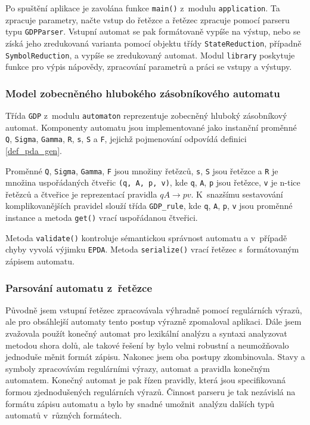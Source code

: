 Po spuštění aplikace je zavolána funkce \texttt{main()} z~modulu \texttt{application}. Ta zpracuje parametry, načte vstup do řetězce a řetězec zpracuje pomocí parseru typu \texttt{GDPParser}. Vstupní automat se pak formátovaně vypíše na výstup, nebo se získá jeho zredukovaná varianta pomocí objektu třídy \texttt{StateReduction}, případně \texttt{SymbolReduction}, a vypíše se zredukovaný automat. Modul \texttt{library} poskytuje funkce pro výpis nápovědy, zpracování parametrů a práci se vstupy a výstupy.


\subsubsection{Model zobecněného hlubokého zásobníkového automatu}

Třída \texttt{GDP} z~modulu \texttt{automaton} reprezentuje zobecněný hluboký zásobníkový automat. Komponenty automatu jsou implementované jako instanční proměnné \texttt{Q}, \texttt{Sigma}, \texttt{Gamma}, \texttt{R}, \texttt{s}, \texttt{S} a \texttt{F}, jejichž pojmenování odpovídá definici \ref{def_pda_gen}. 

Proměnné \texttt{Q}, \texttt{Sigma}, \texttt{Gamma}, \texttt{F} jsou množiny řetězců, \texttt{s}, \texttt{S} jsou řetězce a \texttt{R} je množina uspořádaných čtveřic \texttt{(q, A, p, v)}, kde \texttt{q}, \texttt{A}, \texttt{p} jsou řetězce, \texttt{v} je n-tice řetězců a čtveřice je reprezentací pravidla $qA \rightarrow pv$. 
K~snazšímu sestavování komplikovanějších pravidel slouží třída \texttt{GDP\_rule}, kde \texttt{q}, \texttt{A}, \texttt{p}, \texttt{v} jsou proměnné instance a metoda \texttt{get()} vrací uspořádanou čtveřici.

Metoda \texttt{validate()} kontroluje sémantickou správnost automatu a v~případě chyby vyvolá výjimku \texttt{EPDA}. Metoda \texttt{serialize()} vrací řetězec s~formátovaným zápisem automatu.

\subsubsection{Parsování automatu z~řetězce}

Původně jsem vstupní řetězec zpracovávala výhradně pomocí regulárních výrazů, ale pro obsáhlejší automaty tento postup výrazně zpomaloval aplikaci. Dále jsem zvažovala použít konečný automat pro lexikální analýzu a syntaxi analyzovat metodou shora dolů, ale takové řešení by bylo velmi robustní a neumožňovalo jednoduše měnit formát zápisu. Nakonec jsem oba postupy zkombinovala. Stavy a symboly zpracovávám regulárními výrazy, automat a pravidla konečným automatem. Konečný automat je pak řízen pravidly, která jsou specifikovaná formou zjednodušených regulárních výrazů. Činnost parseru je tak nezávislá na formátu zápisu automatu a bylo by snadné umožnit~analýzu dalších typů automatů v~různých formátech.

